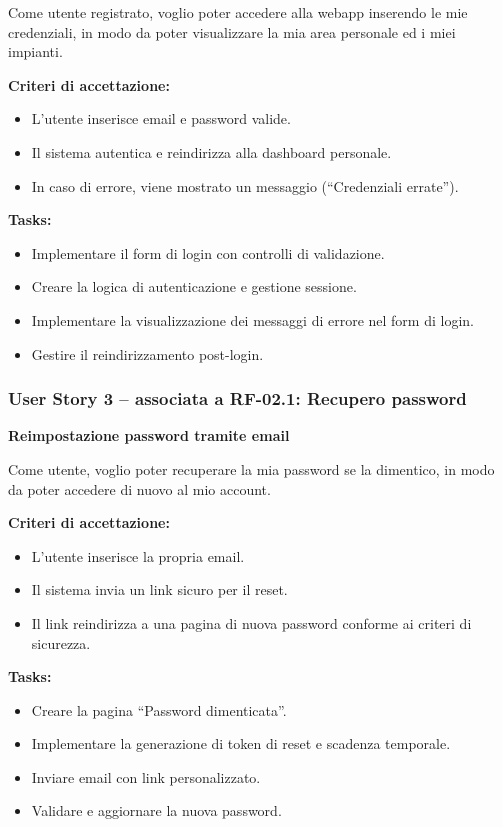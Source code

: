 Come utente registrato, voglio poter accedere alla webapp inserendo le mie credenziali, in modo da poter visualizzare la mia area personale ed i miei impianti.

\textbf{Criteri di accettazione:}
\begin{itemize}
    \item L'utente inserisce email e password valide.
    \item Il sistema autentica e reindirizza alla dashboard personale.
    \item In caso di errore, viene mostrato un messaggio (“Credenziali errate”).
\end{itemize}
\textbf{Tasks:}
\begin{itemize}
    \item Implementare il form di login con controlli di validazione.
    \item Creare la logica di autenticazione e gestione sessione.
    \item Implementare la visualizzazione dei messaggi di errore nel form di login.
    \item Gestire il reindirizzamento post-login.
\end{itemize}
\subsubsection*{User Story 3 – associata a RF-02.1: Recupero password}
\textbf{Reimpostazione password tramite email}

Come utente, voglio poter recuperare la mia password se la dimentico, in modo da poter accedere di nuovo al mio account.

\textbf{Criteri di accettazione:}
\begin{itemize}
    \item L’utente inserisce la propria email.
    \item Il sistema invia un link sicuro per il reset.
    \item Il link reindirizza a una pagina di nuova password conforme ai criteri di sicurezza.
\end{itemize}
\textbf{Tasks:}
\begin{itemize}
    \item Creare la pagina “Password dimenticata”.
    \item Implementare la generazione di token di reset e scadenza temporale.
    \item Inviare email con link personalizzato.
    \item Validare e aggiornare la nuova password.
\end{itemize}

